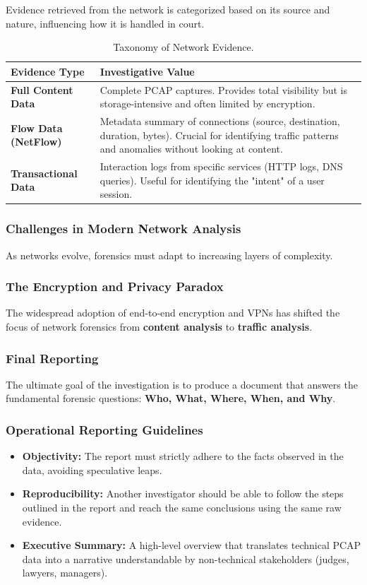 \noindent
Evidence retrieved from the network is categorized based on its source and nature, influencing how it is handled in court.

\begin{table}[H]
\centering
\small
\begin{tabular}{|p{3.5cm}|p{8.5cm}|}
\hline
\textbf{Evidence Type} & \textbf{Investigative Value} \\
\hline
\textbf{Full Content Data} & Complete PCAP captures. Provides total visibility but is storage-intensive and often limited by encryption. \\
\hline
\textbf{Flow Data (NetFlow)} & Metadata summary of connections (source, destination, duration, bytes). Crucial for identifying traffic patterns and anomalies without looking at content. \\
\hline
\textbf{Transactional Data} & Interaction logs from specific services (HTTP logs, DNS queries). Useful for identifying the "intent" of a user session. \\
\hline
\end{tabular}
\caption{Taxonomy of Network Evidence.}
\end{table}

\subsubsection{Challenges in Modern Network Analysis}
As networks evolve, forensics must adapt to increasing layers of complexity.

\subsubsection*{The Encryption and Privacy Paradox}
The widespread adoption of end-to-end encryption and VPNs has shifted the focus of network forensics from \textbf{content analysis} to \textbf{traffic analysis}.


\subsubsection{Final Reporting}
The ultimate goal of the investigation is to produce a document that answers the fundamental forensic questions: \textbf{Who, What, Where, When, and Why}.

\subsubsection*{Operational Reporting Guidelines}
\begin{itemize}
    \item \textbf{Objectivity:} The report must strictly adhere to the facts observed in the data, avoiding speculative leaps.
    \item \textbf{Reproducibility:} Another investigator should be able to follow the steps outlined in the report and reach the same conclusions using the same raw evidence.
    \item \textbf{Executive Summary:} A high-level overview that translates technical PCAP data into a narrative understandable by non-technical stakeholders (judges, lawyers, managers).
\end{itemize}

